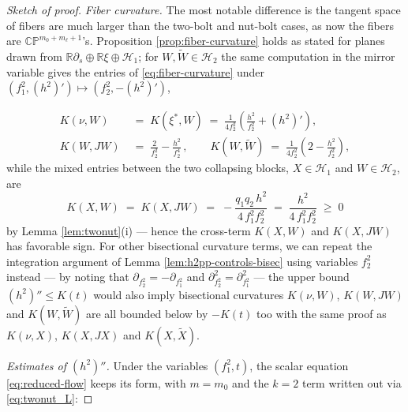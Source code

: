 \documentclass[11pt]{amsart}
\theoremstyle{plain}
\numberwithin{equation}{section}
\theoremstyle{definition}
\theoremstyle{remark}
\begin{document}
\begin{proof}[Sketch of proof]
\emph{Fiber curvature.} The most notable difference is the tangent space of fibers are much larger than the two-bolt and nut-bolt cases, as now the fibers are $\mathbb{CP}^{m_0+m_\ell+1}$'s. Proposition \ref{prop:fiber-curvature} holds as stated for planes drawn from $\mathbb{R} \partial_s \oplus \mathbb{R} \xi \oplus \mathcal{H}_1$; for $W, \widetilde{W} \in \mathcal{H}_2$ the same computation in the mirror variable gives the entries of \eqref{eq:fiber-curvature} under $( f_1^2 , ( h^2 )' ) \mapsto ( f_2^2 , - ( h^2 )' )$,

\begin{align*}
K ( \nu, W ) & \;=\; K ( \xi^*, W ) \;=\; \frac{1}{4 f_2^2} \left( \frac{h^2}{f_2^2} + ( h^2 )' \right) ,\\
 K ( W, J W ) & \;=\; \frac{2}{f_2^2} - \frac{h^2}{f_2^4} \,, \qquad K ( W, \widetilde{W} ) \;=\; \frac{1}{4 f_2^2} \left( 2 - \frac{h^2}{f_2^2} \right) ,
\end{align*}
while the mixed entries between the two collapsing blocks, $X \in \mathcal{H}_1$ and $W \in \mathcal{H}_2$, are
\[
K ( X, W ) \;=\; K ( X, J W ) \;=\; - \frac{q_1 q_2\, h^2}{4\, f_1^2 f_2^2} \;=\; \frac{h^2}{4\, f_1^2 f_2^2} \;\geq\; 0
\]
by Lemma \ref{lem:twonut}(i) --- hence the cross-term $K(X,W)$ and $K(X,JW)$ has favorable sign. For other bisectional curvature terms, we can repeat the integration argument of Lemma \ref{lem:h2pp-controls-bisec} using variables $f_2^2$ instead --- by noting that $\partial_{f_2^2} = -\partial_{f_1^2}$ and $\partial_{f_2^2}^2 = \partial_{f_1^2}^2$ --- the upper bound $( h^2 )'' \leq K (t)$ would also imply bisectional curvatures $K(\nu, W)$, $K(W,JW)$ and $K(W,\widetilde{W})$ are all bounded below by $- K (t)$ too with the same proof as $K(\nu,X)$, $K(X,JX)$ and $K(X,\widetilde{X})$.

\emph{Estimates of $(h^2)''$.} Under the variables $( f_1^2, t )$, the scalar equation \eqref{eq:reduced-flow} keeps its form, with $m = m_0$ and the $k = 2$ term written out via \eqref{eq:twonut_L}:


\end{proof}
\end{document}
